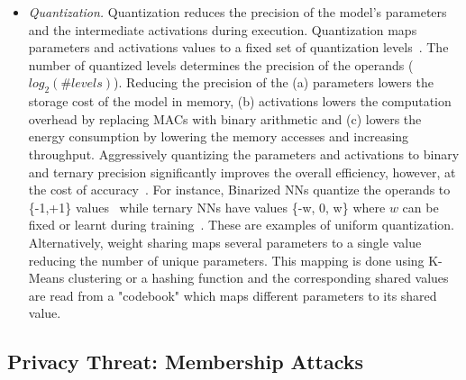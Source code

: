 \begin{itemize}[leftmargin=*]
\item {\em Quantization.}
Quantization reduces the precision of the model's parameters and the intermediate activations during execution.
Quantization maps parameters and activations values to a fixed set of quantization levels~\cite{Hubara:2017:QNN:3122009.3242044}.
The number of quantized levels determines the precision of the operands ($log_2(\#levels)$).
Reducing the precision of the (a) parameters lowers the storage cost of the model in memory, (b) activations lowers the computation overhead by replacing MACs with binary arithmetic and (c) lowers the energy consumption by lowering the memory accesses and increasing throughput.
Aggressively quantizing the parameters and activations to binary and ternary precision significantly improves the overall efficiency, however, at the cost of accuracy~\cite{rastegari2016xnornet}.
For instance, Binarized NNs quantize the operands to \{-1,+1\} values~\cite{NIPS2016_6573} while ternary NNs have values \{-w, 0, w\} where $w$ can be fixed or learnt during training~\cite{Li2016TernaryWN}. These are examples of uniform quantization.
Alternatively, weight sharing maps several parameters to a single value reducing the number of unique parameters.
This mapping is done using K-Means clustering or a hashing function and the corresponding shared values are read from a "codebook" which maps different parameters to its shared value.
\end{itemize}





\subsection{Privacy Threat: Membership Attacks}
\label{threatmodel}


